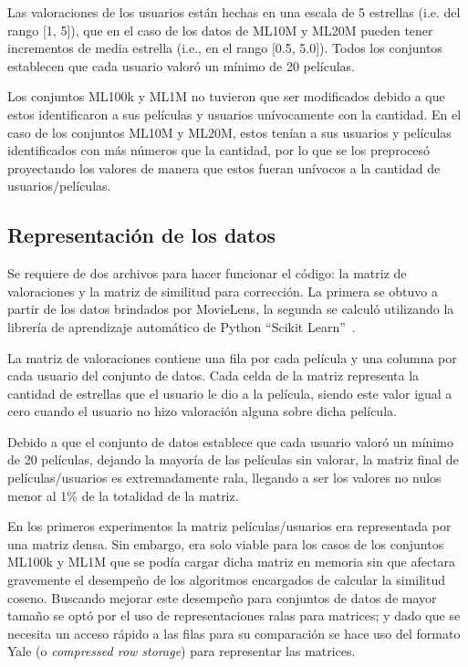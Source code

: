 \documentclass[11pt, a4paper]{article}
\begin{document}
  Las valoraciones de los usuarios están hechas en una escala de 5 estrellas
  (i.e. del rango [1, 5]), que en el caso de los datos de ML10M y ML20M pueden
  tener incrementos de media estrella (i.e., en el rango [0.5, 5.0]). Todos los
  conjuntos establecen que cada usuario valoró un mínimo de 20 películas.

  Los conjuntos ML100k y ML1M no tuvieron que ser modificados debido a que
  estos identificaron a sus películas y usuarios unívocamente con la cantidad.
  En el caso de los conjuntos ML10M y ML20M, estos tenían a sus usuarios y
  películas identificados con más números que la cantidad, por lo que se los
  preprocesó proyectando los valores de manera que estos fueran unívocos a la
  cantidad de usuarios/películas.

  \subsection{Representación de los datos}\label{sec:representaciones}

  Se requiere de dos archivos para hacer funcionar el código: la matriz de
  valoraciones y la matriz de similitud para corrección. La primera se obtuvo a
  partir de los datos brindados por MovieLens, la segunda se calculó utilizando
  la librería de aprendizaje automático de Python ``Scikit
  Learn''~\cite{scikit-learn}.

  La matriz de valoraciones contiene una fila por cada película y una columna
  por cada usuario del conjunto de datos.  Cada celda de la matriz representa
  la cantidad de estrellas que el usuario le dio a la película, siendo este
  valor igual a cero cuando el usuario no hizo valoración alguna sobre dicha
  película.

  Debido a que el conjunto de datos establece que cada usuario valoró un mínimo
  de 20 películas, dejando la mayoría de las películas sin valorar, la matriz
  final de películas/usuarios es extremadamente rala, llegando a ser los
  valores no nulos menor al 1\% de la totalidad de la matriz.

  En los primeros experimentos la matriz películas/usuarios era representada
  por una matriz densa. Sin embargo, era solo viable para los casos de los
  conjuntos ML100k y ML1M que se podía cargar dicha matriz en memoria sin que
  afectara gravemente el desempeño de los algoritmos encargados de calcular la
  similitud coseno. Buscando mejorar este desempeño para conjuntos de datos de
  mayor tamaño se optó por el uso de representaciones ralas para matrices; y
  dado que se necesita un acceso rápido a las filas para su comparación se hace
  uso del formato Yale (o {\em compressed row storage}) para representar las
  matrices.
  
\end{document}
